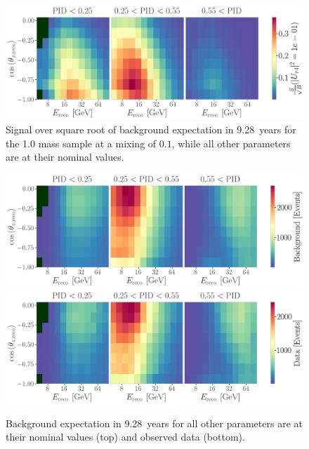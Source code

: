 \begin{figure}
    \includegraphics{figures/results/3d_histograms/labeled_s_to_sqrt_b_1.0_GeV_combined_U_tau4_sq_0.1000_total.png}
    \caption[Three dimensional signal over square root of background expectation]{Signal over square root of background expectation in \SI{9.28}{years} for the \SI{1.0}{\gev} mass sample at a mixing of $0.1$, while all other parameters are at their nominal values.}
\end{figure}

\begin{figure}[h]
    \includegraphics{figures/results/3d_histograms/all_background.png}
    \includegraphics{figures/results/3d_histograms/all_data.png}
    \caption[Three dimensional background expectation and observed data]{Background expectation in \SI{9.28}{years} for all other parameters are at their nominal values (top) and observed data (bottom).}
\end{figure}

